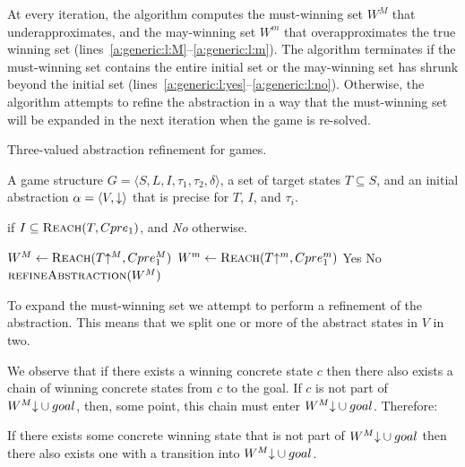 At every iteration, the algorithm computes the must-winning set $W^M$ that underapproximates, and the may-winning set $W^m$ that overapproximates the true winning set (lines~\ref{a:generic:l:M}--\ref{a:generic:l:m}). The algorithm terminates if the must-winning set contains the entire initial set or the may-winning set has shrunk beyond the initial set (lines~\ref{a:generic:l:yes}--\ref{a:generic:l:no}).  Otherwise, the algorithm attempts to refine the abstraction in a way that the must-winning set will be expanded in the next iteration when the game is re-solved.

\begin{algorithm}
\caption{Three-valued abstraction refinement for games.}
\label{alg:generic}

\begin{algorithmic}[1]

\Require A game structure $G = \langle S, L, I, \tau_1, \tau_2, \delta \rangle$, a set of target states $T\subseteq S$, and an initial abstraction $\alpha=\langle V, \mathord{\downarrow} \rangle$ that is precise for $T$, $I$, and $\tau_i$.

 if $I \subseteq \textsc{Reach}(T, Cpre_1)$, and {\it No} otherwise.

    \Loop
        \State $W^M \gets \textsc{Reach}(T\mathord{\uparrow^M}, Cpre_1^M)$ \label{a:generic:l:M}
        \State $W^m \gets \textsc{Reach}(T\mathord{\uparrow^m}, Cpre_1^m)$ \label{a:generic:l:m}
         \label{alg:tvg:tc1}
            \State\Return Yes \label{a:generic:l:yes}
         \label{alg:tvg:tc2}
            \State\Return No \label{a:generic:l:no}
        \Else       
            \State$\Call{refineAbstraction}{W^M}$
        \EndIf
    \EndLoop
\EndFunction

\end{algorithmic}
\end{algorithm}

To expand the must-winning set we attempt to perform a refinement of the abstraction. This means that we split one or more of the abstract states in $V$ in two. 

We observe that if there exists a winning concrete state $c$ then there also exists a chain of winning concrete states from $c$ to the goal. If $c$ is not part of $W^M\mathord{\downarrow} \cup goal$, then, some point, this chain must enter $W^M\mathord{\downarrow} \cup goal$. Therefore: 

\begin{thm}
If there exists some concrete winning state that is not part of $W^M\mathord{\downarrow} \cup goal$ then there also exists one with a transition into $W^M\mathord{\downarrow} \cup goal$. 
\end{thm}

